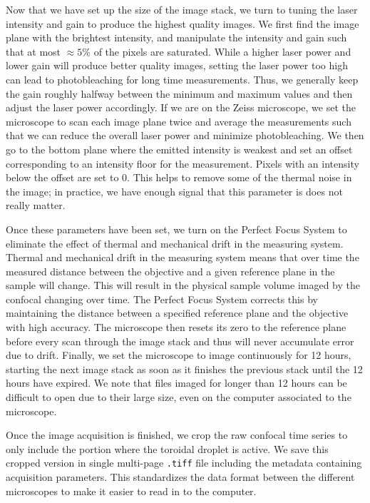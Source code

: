 Now that we have set up the size of the image stack, we turn to tuning the laser intensity and gain to produce the highest quality images.
We first find the image plane with the brightest intensity, and manipulate the intensity and gain such that at most $\approx 5$\%  of the pixels are saturated.
While a higher laser power and lower gain will produce better quality images, setting the laser power too high can lead to photobleaching for long time measurements.
Thus, we generally keep the gain roughly halfway between the minimum and maximum values and then adjust the laser power accordingly.
If we are on the Zeiss microscope, we set the microscope to scan each image plane twice and average the measurements such that we can reduce the overall laser power and minimize photobleaching.
We then go to the bottom plane where the emitted intensity is weakest and set an offset corresponding to an intensity floor for the measurement.
Pixels with an intensity below the offset are set to 0.
This helps to remove some of the thermal noise in the image; in practice, we have enough signal that this parameter is does not really matter.

Once these parameters have been set, we turn on the Perfect Focus System to eliminate the effect of thermal and mechanical drift in the measuring system.
Thermal and mechanical drift in the measuring system means that over time the measured distance between the objective and a given reference plane in the sample will change.
This will result in the physical sample volume imaged by the confocal changing over time.
The Perfect Focus System corrects this by maintaining the distance between a specified reference plane and the objective with high accuracy.
The microscope then resets its zero to the reference plane before every scan through the image stack and thus will never accumulate error due to drift.
Finally, we set the microscope to image continuously for 12 hours, starting the next image stack as soon as it finishes the previous stack until the 12 hours have expired.
We note that files imaged for longer than 12 hours can be difficult to open due to their large size, even on the computer associated to the microscope.

Once the image acquisition is finished, we crop the raw confocal time series to only include the portion where the toroidal droplet is active.
We save this cropped version in single multi-page \texttt{.tiff} file including the metadata containing acquisition parameters.
This standardizes the data format between the different microscopes to make it easier to read in to the computer.


